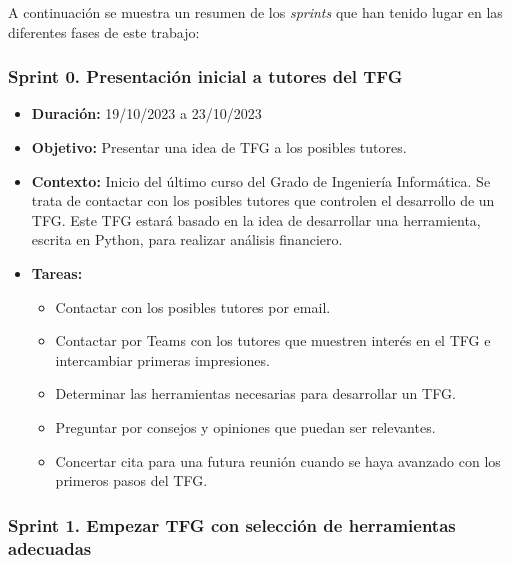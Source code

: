 A continuación se muestra un resumen de los \emph{sprints} que han tenido lugar en las diferentes fases de este trabajo:


\subsubsection{Sprint 0. Presentación inicial a tutores del TFG}

\begin{itemize}
\item  
\textbf{Duración:} 19/10/2023 a 23/10/2023

\item
\textbf{Objetivo:} Presentar una idea de TFG a los posibles tutores. 

\item
\textbf{Contexto:} Inicio del último curso del Grado de Ingeniería Informática. Se trata de contactar con los posibles tutores que controlen el desarrollo de un TFG. Este TFG estará basado en la idea de desarrollar una herramienta, escrita en Python, para realizar análisis financiero. 

\item
\textbf{Tareas:}
	\begin{itemize}
	\tightlist
	\item 
	Contactar con los posibles tutores por email.
	\item
	Contactar por Teams con los tutores que muestren interés en el TFG e intercambiar primeras impresiones.
	\item
	Determinar las herramientas necesarias para desarrollar un TFG.
	\item
	Preguntar por consejos y opiniones que puedan ser relevantes. 
	\item
	Concertar cita para una futura reunión cuando se haya avanzado con los primeros pasos del TFG.
	\end{itemize}
\end{itemize}


\subsubsection{Sprint 1. Empezar TFG con selección de herramientas adecuadas}

